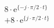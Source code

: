 \begin{align*}
&  8 \cdot \textrm{e}^{\{-j \cdot \pi/2 \cdot t \}} \\
&+ 8 \cdot \textrm{e}^{\{ j \cdot \pi/2 \cdot t \}}
\end{align*}
